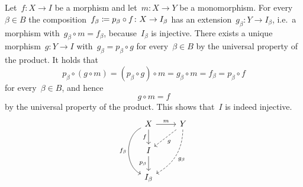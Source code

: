 \section{}

Let~$f \colon X \to I$ be a morphism and let~$m \colon X \to Y$ be a monomorphism.
For every~$\beta \in B$ the composition~$f_\beta \coloneqq p_\beta \circ f \colon X \to I_\beta$ has an extension~$g_\beta \colon Y \to I_\beta$, i.e.\ a morphism with~$g_\beta \circ m = f_\beta$, because~$I_\beta$ is injective.
There exists a unique morphism~$g \colon Y \to I$ with~$g_\beta = p_\beta \circ g$ for every~$\beta \in B$ by the universal property of the product.
It holds that
\[
  p_\beta \circ (g \circ m)
  =
  (p_\beta \circ g) \circ m
  =
  g_\beta \circ m
  =
  f_\beta
  =
  p_\beta \circ f
\]
for every~$\beta \in B$, and hence
\[
  g \circ m
  =
  f
\]
by the universal property of the product.
This shows that~$I$ is indeed injective.
\[
  \begin{tikzcd}
      X
      \arrow{r}[above]{m}
      \arrow{d}[left]{f}
      \arrow[bend right = 65]{dd}[left]{f_\beta}
    & Y
      \arrow[dashed]{dl}[below right]{g}
      \arrow[dashed, bend left]{ddl}[below right]{g_\beta}
    \\
      I
      \arrow{d}[left]{p_\beta}
    & {}
    \\
      I_\beta
    & {}
  \end{tikzcd}
\]




